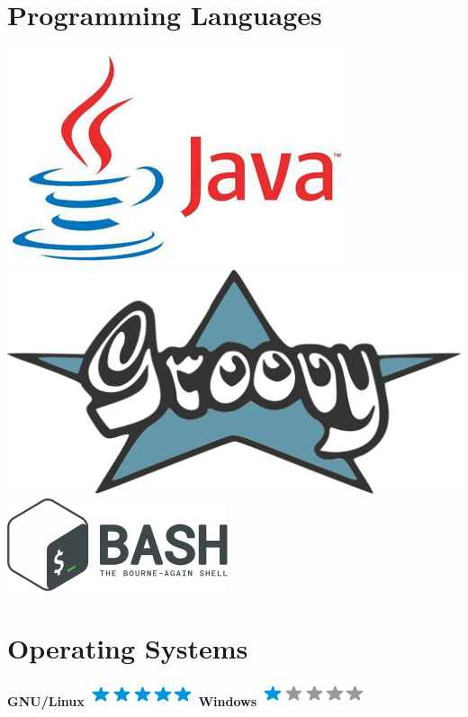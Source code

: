 \documentclass[]{friggeri-cv}
\begin{document}
\newpage
\begin{aside}
    ~
    ~
    \section{Programming Languages}
    \includegraphics[scale=0.20]{img/java}
    \includegraphics[scale=0.07]{img/groovy}
    \includegraphics[scale=0.3]{img/bash}
    ~
    ~
    \section{Operating Systems}
    \textbf{GNU/Linux}\includegraphics[scale=0.40]{img/5stars.png}
    \textbf{Windows}\includegraphics[scale=0.40]{img/1stars.png}
    ~

\end{aside}
\end{document}
